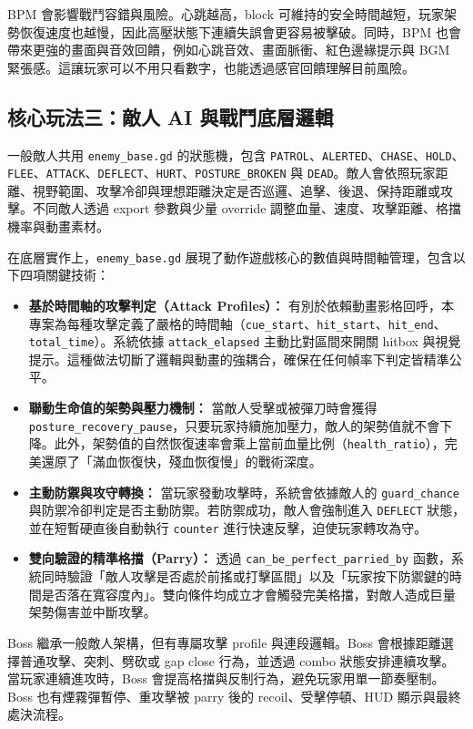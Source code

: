 \documentclass[12pt,a4paper]{article}
\begin{document}
BPM 會影響戰鬥容錯與風險。心跳越高，block 可維持的安全時間越短，玩家架勢恢復速度也越慢，因此高壓狀態下連續失誤會更容易被擊破。同時，BPM 也會帶來更強的畫面與音效回饋，例如心跳音效、畫面脈衝、紅色邊緣提示與 BGM 緊張感。這讓玩家可以不用只看數字，也能透過感官回饋理解目前風險。

\subsection{核心玩法三：敵人 AI 與戰鬥底層邏輯}
一般敵人共用 \texttt{enemy\_base.gd} 的狀態機，包含 \texttt{PATROL}、\texttt{ALERTED}、\texttt{CHASE}、\texttt{HOLD}、\texttt{FLEE}、\texttt{ATTACK}、\texttt{DEFLECT}、\texttt{HURT}、\texttt{POSTURE\_BROKEN} 與 \texttt{DEAD}。敵人會依照玩家距離、視野範圍、攻擊冷卻與理想距離決定是否巡邏、追擊、後退、保持距離或攻擊。不同敵人透過 export 參數與少量 override 調整血量、速度、攻擊距離、格擋機率與動畫素材。

在底層實作上，\texttt{enemy\_base.gd} 展現了動作遊戲核心的數值與時間軸管理，包含以下四項關鍵技術：
\begin{itemize}[leftmargin=2em]
  \item \textbf{基於時間軸的攻擊判定（Attack Profiles）：} 有別於依賴動畫影格回呼，本專案為每種攻擊定義了嚴格的時間軸（\texttt{cue\_start}、\texttt{hit\_start}、\texttt{hit\_end}、\texttt{total\_time}）。系統依據 \texttt{attack\_elapsed} 主動比對區間來開關 hitbox 與視覺提示。這種做法切斷了邏輯與動畫的強耦合，確保在任何幀率下判定皆精準公平。
  \item \textbf{聯動生命值的架勢與壓力機制：} 當敵人受擊或被彈刀時會獲得 \texttt{posture\_recovery\_pause}，只要玩家持續施加壓力，敵人的架勢值就不會下降。此外，架勢值的自然恢復速率會乘上當前血量比例（\texttt{health\_ratio}），完美還原了「滿血恢復快，殘血恢復慢」的戰術深度。
  \item \textbf{主動防禦與攻守轉換：} 當玩家發動攻擊時，系統會依據敵人的 \texttt{guard\_chance} 與防禦冷卻判定是否主動防禦。若防禦成功，敵人會強制進入 \texttt{DEFLECT} 狀態，並在短暫硬直後自動執行 \texttt{counter} 進行快速反擊，迫使玩家轉攻為守。
  \item \textbf{雙向驗證的精準格擋（Parry）：} 透過 \texttt{can\_be\_perfect\_parried\_by} 函數，系統同時驗證「敵人攻擊是否處於前搖或打擊區間」以及「玩家按下防禦鍵的時間是否落在寬容度內」。雙向條件均成立才會觸發完美格擋，對敵人造成巨量架勢傷害並中斷攻擊。
\end{itemize}

Boss 繼承一般敵人架構，但有專屬攻擊 profile 與連段邏輯。Boss 會根據距離選擇普通攻擊、突刺、劈砍或 gap close 行為，並透過 combo 狀態安排連續攻擊。當玩家連續進攻時，Boss 會提高格擋與反制行為，避免玩家用單一節奏壓制。Boss 也有煙霧彈暫停、重攻擊被 parry 後的 recoil、受擊停頓、HUD 顯示與最終處決流程。
\end{document}
